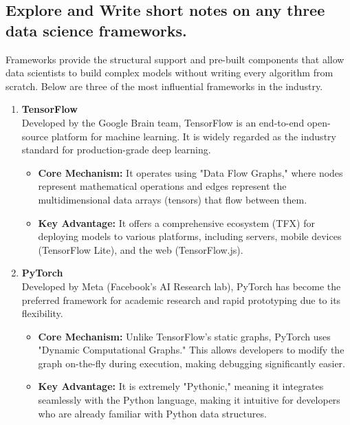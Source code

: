 \documentclass[a4paper,12pt]{article}
\begin{document}
\subsection{Explore and Write short notes on any three data science frameworks.}

Frameworks provide the structural support and pre-built components that allow data scientists to build complex models without writing every algorithm from scratch. Below are three of the most influential frameworks in the industry.

\begin{enumerate}
    \item \textbf{TensorFlow} \\
    Developed by the Google Brain team, TensorFlow is an end-to-end open-source platform for machine learning. It is widely regarded as the industry standard for production-grade deep learning.
    \begin{itemize}
        \item \textbf{Core Mechanism:} It operates using "Data Flow Graphs," where nodes represent mathematical operations and edges represent the multidimensional data arrays (tensors) that flow between them.
        \item \textbf{Key Advantage:} It offers a comprehensive ecosystem (TFX) for deploying models to various platforms, including servers, mobile devices (TensorFlow Lite), and the web (TensorFlow.js).
    \end{itemize}

    \item \textbf{PyTorch} \\
    Developed by Meta (Facebook’s AI Research lab), PyTorch has become the preferred framework for academic research and rapid prototyping due to its flexibility.
    \begin{itemize}
        \item \textbf{Core Mechanism:} Unlike TensorFlow's static graphs, PyTorch uses "Dynamic Computational Graphs." This allows developers to modify the graph on-the-fly during execution, making debugging significantly easier.
        \item \textbf{Key Advantage:} It is extremely "Pythonic," meaning it integrates seamlessly with the Python language, making it intuitive for developers who are already familiar with Python data structures.
    \end{itemize}


\end{enumerate}
\end{document}
